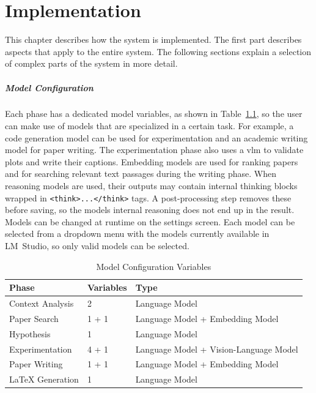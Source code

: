 \chapter{Implementation}
\label{ch:implementation}

This chapter describes how the system is implemented. 
The first part describes aspects that apply to the entire system. 
The following sections explain a selection of complex parts of the system in more detail.

\paragraph{Model Configuration}
Each phase has a dedicated model variables, as shown in Table~\ref{tab:model_variables}, so the user can make use of models that are specialized in a certain task.
For example, a code generation model can be used for experimentation and an academic writing model for paper writing.
The experimentation phase also uses a \gls{vlm} to validate plots and write their captions.
Embedding models are used for ranking papers and for searching relevant text passages during the writing phase.
When reasoning models are used, their outputs may contain internal thinking blocks wrapped in \texttt{<think>...</think>} tags.
A post-processing step removes these before saving, so the models internal reasoning does not end up in the result.
Models can be changed at runtime on the settings screen.
Each model can be selected from a dropdown menu with the models currently available in LM~Studio, so only valid models can be selected.

\begin{table}[htbp]
    \centering
    \caption{Model Configuration Variables}
    \label{tab:model_variables}
    \begin{tabularx}{\textwidth}{l l X}
        \toprule
        \textbf{Phase} & \textbf{Variables} & \textbf{Type} \\
        \midrule
        Context Analysis & 2 & Language Model \\
        Paper Search & 1 + 1 & Language Model + Embedding Model \\
        Hypothesis & 1 & Language Model \\
        Experimentation & 4 + 1 & Language Model + Vision-Language Model \\
        Paper Writing & 1 + 1 & Language Model + Embedding Model \\
        \LaTeX{} Generation & 1 & Language Model \\
        \bottomrule
    \end{tabularx}
\end{table}

